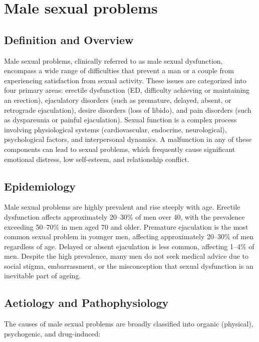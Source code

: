 \chapter{Male sexual problems}

\section*{Definition and Overview}
Male sexual problems, clinically referred to as male sexual dysfunction, encompass a wide range of difficulties that prevent a man or a couple from experiencing satisfaction from sexual activity. These issues are categorized into four primary areas: erectile dysfunction (ED, difficulty achieving or maintaining an erection), ejaculatory disorders (such as premature, delayed, absent, or retrograde ejaculation), desire disorders (loss of libido), and pain disorders (such as dyspareunia or painful ejaculation). Sexual function is a complex process involving physiological systems (cardiovascular, endocrine, neurological), psychological factors, and interpersonal dynamics. A malfunction in any of these components can lead to sexual problems, which frequently cause significant emotional distress, low self-esteem, and relationship conflict.

\section*{Epidemiology}
Male sexual problems are highly prevalent and rise steeply with age. Erectile dysfunction affects approximately 20--30\% of men over 40, with the prevalence exceeding 50--70\% in men aged 70 and older. Premature ejaculation is the most common sexual problem in younger men, affecting approximately 20--30\% of men regardless of age. Delayed or absent ejaculation is less common, affecting 1--4\% of men. Despite the high prevalence, many men do not seek medical advice due to social stigma, embarrassment, or the misconception that sexual dysfunction is an inevitable part of ageing.

\section*{Aetiology and Pathophysiology}
The causes of male sexual problems are broadly classified into organic (physical), psychogenic, and drug-induced:


